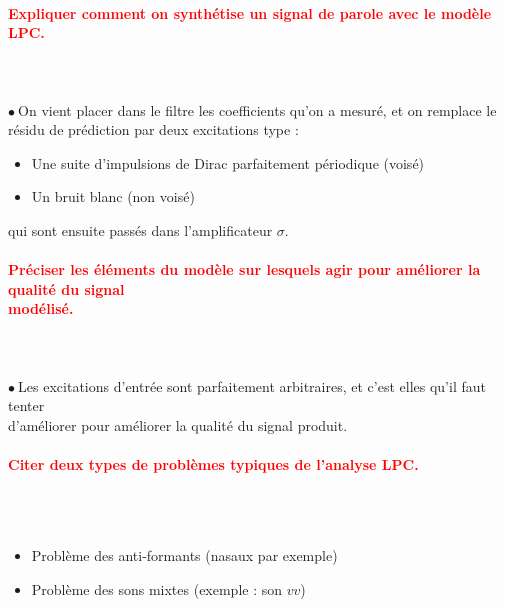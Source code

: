 \documentclass[letterpaper, 12pt]{article}
\newcommand{\alinea}{
\hspace*{0.3cm}}
\newcommand{\red}[1]{
	\textcolor{red}{#1}
}
\newcommand{\point}{$\bullet\ $}
\begin{document}
		\paragraph{\red{Expliquer comment on synthétise un signal de parole avec le modèle LPC.}}~\\~\\
			\point On vient placer dans le filtre les coefficients qu'on a mesuré, et on remplace le
				\\\alinea résidu de prédiction par deux excitations type : 
				\begin{itemize}
					\setlength{\itemsep}{0pt}		
					\setlength{\parskip}{0pt}		
					\setlength{\parsep}{0pt}	
					\item Une suite d'impulsions de Dirac parfaitement périodique (voisé)
					\item Un bruit blanc (non voisé)
				\end{itemize}
				qui sont ensuite passés dans l'amplificateur $\sigma$.
		
		\paragraph{\red{Préciser les éléments du modèle sur lesquels agir pour améliorer la qualité du signal 
		~\\ \hspace*{0.035cm} modélisé.}}~\\~\\
			\point Les excitations d'entrée sont parfaitement arbitraires, et c'est elles qu'il faut tenter
				\\\alinea d'améliorer pour améliorer la qualité du signal produit.
		
		\paragraph{\red{Citer deux types de problèmes typiques de l'analyse LPC.}}~\\~\\
			\begin{itemize}
				\setlength{\itemsep}{0pt}		
				\setlength{\parskip}{0pt}		
				\setlength{\parsep}{0pt}	
				\item Problème des anti-formants (nasaux par exemple)
				\item Problème des sons mixtes (exemple : son $vv$)
			\end{itemize}
		
\end{document}
